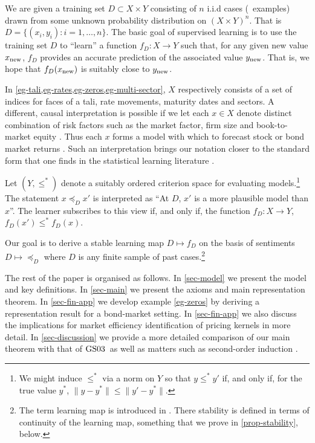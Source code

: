 \documentclass[12pt,a4paper,twoside]{article}
\newcommand{\gsii}{$\textup{GS03}$}
\newcommand{\preceqb}{\mathbin{\preceq}}
\begin{document}
\begin{example}\label{eg-supervised}
  We are given a training set $D \subset X\times Y$ consisting of $n$ i.i.d
  cases (\ie\ examples) drawn from some unknown probability distribution
  on $(X\times Y)^n$. That is $ D = \{(x_i, y_i): i = 1, \dots, n\}$. The basic
  goal of supervised learning is to use the training set $D$ to ``learn'' a
  function $f_D: X \rightarrow Y$ such that, for any given new value
  $x_{\textup{new}}$, $f_D$ provides an accurate prediction of the associated
  value $y_\textup{new}$. That is, we hope that $f_D(x_\textup{new})$ is
  suitably close to $y_\textup{new}$.
\end{example}

\begin{example}\label{eg-factors}
  In \cref{eg-tali,eg-rates,eg-zeros,eg-multi-sector}, $X$ respectively
  consists of a set of indices for faces of a tali, rate movements, maturity
  dates and sectors. A different, causal interpretation is possible if we let
  each $x \in X$ denote distinct combination of risk factors such as the market
  factor, firm size and book-to-market equity \citep{fama2015five}. Thus each
  $x$ forms a model with which to forecast stock or bond market returns
  \citep{fama2015five,harvey2021lucky,gu2020empirical}.  Such an interpretation
  brings our notation closer to the standard form that one finds in the
  statistical learning literature
  \citep{cucker2001mathematical,poggio2003mathematics,mukherjee2006learning}.


  Let $(Y, \leq^*)$ denote a suitably ordered criterion space for evaluating
  models.\footnote{We might induce $\leq^*$ via a norm on $Y$ so that $y \leq^*
  y'$ if, and only if, for the true value $y^*$, $\lVert y - y^*\rVert \leq
  \lVert y' - y^*\rVert$.}  The statement $x \preceq_D x'$ is interpreted as
  ``At $D$, $x'$ is a more plausible model than $x$''. The learner subscribes
  to this view if, and only if, the function $f_D: X \rightarrow Y$, $f_D(x')
  \leq^* f_D(x)$.

  Our goal is to derive a stable learning map $D \mapsto f_D$ on the basis of
  {sentiments} $D \mapsto \preceqb_D$ where $D$ is any finite sample of past
  cases.\footnote{The term learning map is introduced in
  \citet{mukherjee2006learning}. There stability is defined in terms of continuity
  of the learning map, something that we prove in \cref{prop-stability},
  below.}
\end{example}
    The rest of the paper is organised as follows. In \cref{sec-model} we
    present the model and key definitions. In \cref{sec-main} we present the
    axioms and main representation theorem. In \cref{sec-fin-app} we develop
    example \cref{eg-zeros} by deriving a representation result for a
    bond-market setting. In \cref{sec-fin-app} we also discuss the implications
    for market efficiency identification of pricing kernels in more detail. In
    \cref{sec-discussion} we provide a more detailed comparison of our main
    theorem with that of \gsii\ as well as matters such as second-order
    induction \citep{argenziano2019second}.
 
\end{document}
